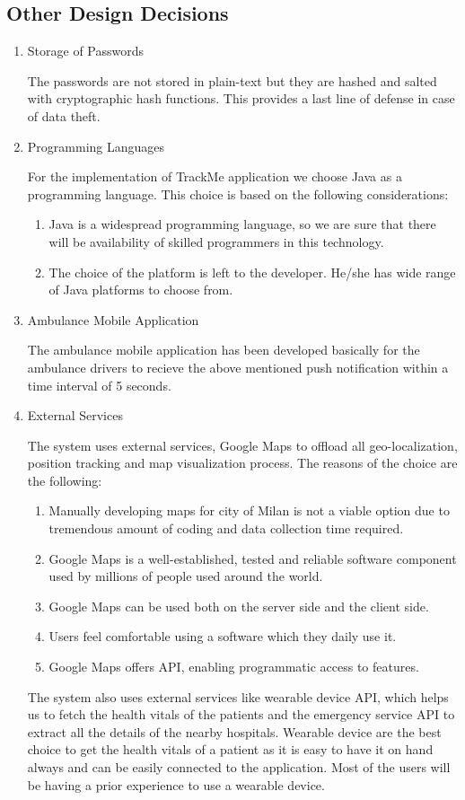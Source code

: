 \subsection{Other Design Decisions}
\begin{enumerate}
\item Storage of Passwords
\par The passwords are not stored in plain-text but they are hashed and salted with cryptographic hash functions. This provides a last line of defense in case of data theft.
\item Programming Languages
\par For the implementation of TrackMe application we choose Java as a programming language. This choice is based on the following considerations:
	\begin{enumerate}
	\item Java is a widespread programming language, so we are sure that there will be availability of skilled programmers in this technology.
    \item The choice of the platform is left to the developer. He/she has wide range of Java platforms to choose from.
	\end{enumerate}
\item Ambulance Mobile Application
\par The ambulance mobile application has been developed basically for the ambulance drivers to recieve the above mentioned push notification within a time interval of 5 seconds.
\item External Services
\par The system uses external services, Google Maps to offload all geo-localization, position tracking and map visualization process. The reasons of the choice are the following:
	\begin{enumerate}
	\item Manually developing maps for city of Milan is not a viable option due to tremendous amount of coding and data collection time required.
    \item Google Maps is a well-established, tested and reliable software component used by millions of people used around the world.
    \item Google Maps can be used both on the server side and the client side. 
    \item Users feel comfortable using a software which they daily use it.
    \item Google Maps offers API, enabling programmatic access to features.
	\end{enumerate}
    
\par The system also uses external services like wearable device API, which helps us to fetch the health vitals of the patients and the emergency service API to extract all the details of the nearby hospitals. Wearable device are the best choice to get the health vitals of a patient as it is easy to have it on hand always and can be easily connected to the application. Most of the users will be having a prior experience to use a wearable device.
\end{enumerate}
